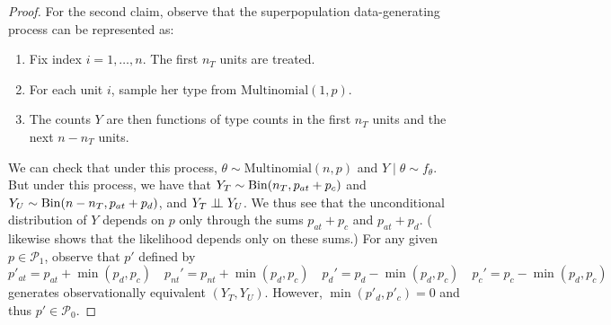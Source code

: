 \documentclass[12pt,reqno]{amsart}
\begin{document}
\begin{proof}
For the second claim, observe that the superpopulation data-generating process can be
    represented as: 
    \begin{enumerate}
        \item Fix index $i = 1,\ldots, n$. The first $n_T$ units are treated.
        \item For each unit $i$, sample her type from $\mathrm{Multinomial}(1, p).$
        \item The counts $Y$ are then functions of type counts in the first $n_T$ units
        and the next $n-n_T$ units. 
    \end{enumerate}
    We can check that under this process, $\theta \sim \mathrm{Multinomial}(n, p)$ and
    $Y \mid \theta \sim f_\theta$. But under this process, we have that $Y_T \sim \operatorname{Bin}
    (n_T, p_ {at} + p_c)$ and $Y_U \sim \operatorname{Bin}(n-n_T, p_{at}
    +
    p_d)$, and $Y_T \perp \!\!\! \perp Y_U$. We thus see that the unconditional distribution of $Y$ depends on $p$ only through the sums $p_{at} + p_c$ and $p_{at} + p_d$. (\citet[][p. 472-3]{copas_randomization_1973} likewise shows that the likelihood depends only on these sums.) For any given $p \in \mathcal P_1$, observe that $p'$ defined by \[
        p'_{at} = p_{at} + \min(p_d, p_c) \quad p_{nt}' = p_{nt} + \min(p_d, p_c) \quad p_d' =
        p_d - \min(p_d, p_c) \quad p_{c}' = p_c - \min(p_d, p_c)
    \]
    generates observationally equivalent $(Y_T, Y_U)$. However, $\min(p'_d, p'_c) = 0$ and
    thus $p' \in \mathcal P_0$. 
\end{proof}


\prophaspower*
\end{document}
